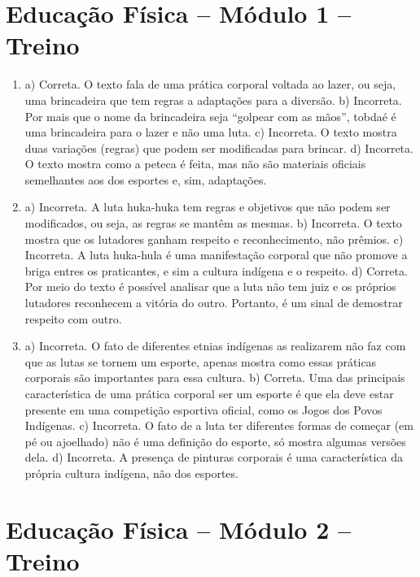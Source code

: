 \section*{Educação Física -- Módulo 1 -- Treino}

\begin{enumerate}
\item
a) Correta. O texto fala de uma prática corporal voltada ao lazer, ou
seja, uma brincadeira que tem regras a adaptações para a diversão.
b) Incorreta. Por mais que o nome da brincadeira seja “golpear com as
mãos”, tobdaé é uma brincadeira para o lazer e não uma luta.
c) Incorreta. O texto mostra duas variações (regras) que podem ser
modificadas para brincar.
d) Incorreta. O texto mostra como a peteca é feita, mas não são
materiais oficiais semelhantes aos dos esportes e, sim, adaptações.

\item
a) Incorreta. A luta huka-huka tem regras e objetivos que não podem ser
modificados, ou seja, as regras se mantêm as mesmas.
b) Incorreta. O texto mostra que os lutadores ganham respeito e
reconhecimento, não prêmios.
c) Incorreta. A luta huka-hula é uma manifestação corporal que não
promove a briga entres os praticantes, e sim a cultura indígena e o
respeito.
d) Correta. Por meio do texto é possível analisar que a luta não tem
juiz e os próprios lutadores reconhecem a vitória do outro. Portanto, é
um sinal de demostrar respeito com outro.

\item
a) Incorreta. O fato de diferentes etnias indígenas as realizarem não faz com que as
lutas se tornem um esporte, apenas mostra como essas práticas corporais
são importantes para essa cultura.
b) Correta. Uma das principais característica de uma prática corporal
ser um esporte é que ela deve estar presente em uma competição esportiva
oficial, como os Jogos dos Povos Indígenas.
c) Incorreta. O fato de a luta ter diferentes formas de começar (em pé ou
ajoelhado) não é uma definição do esporte, só mostra algumas versões dela.
d) Incorreta. A presença de pinturas corporais é uma característica da própria
cultura indígena, não dos esportes.
\end{enumerate}

\section*{Educação Física -- Módulo 2 -- Treino}

